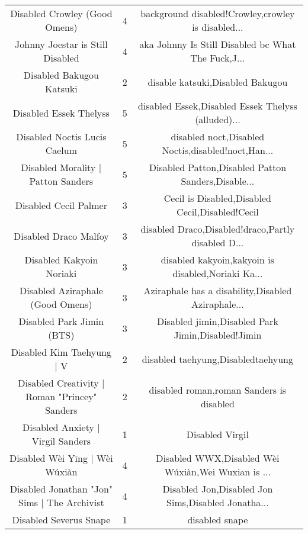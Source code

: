 \begin{table}[h!]
{\begin{tabular}{|c|c|c|}
                     Disabled Crowley (Good Omens) &      4 & background disabled!Crowley,crowley is disabled... \\
                  Johnny Joestar is Still Disabled &      4 & aka Johnny Is Still Disabled bc What The Fuck,J... \\
                          Disabled Bakugou Katsuki &      2 &                   disable katsuki,Disabled Bakugou \\
                            Disabled Essek Thelyss &      5 & disabled Essek,Disabled Essek Thelyss (alluded)... \\
                      Disabled Noctis Lucis Caelum &      5 & disabled noct,Disabled Noctis,disabled!noct,Han... \\
                Disabled Morality | Patton Sanders &      5 & Disabled Patton,Disabled Patton Sanders,Disable... \\
                             Disabled Cecil Palmer &      3 &    Cecil is Disabled,Disabled Cecil,Disabled!Cecil \\
                             Disabled Draco Malfoy &      3 & disabled Draco,Disabled!draco,Partly disabled D... \\
                          Disabled Kakyoin Noriaki &      3 & disabled kakyoin,kakyoin is disabled,Noriaki Ka... \\
                  Disabled Aziraphale (Good Omens) &      3 & Aziraphale has a disability,Disabled Aziraphale... \\
                         Disabled Park Jimin (BTS) &      3 &  Disabled jimin,Disabled Park Jimin,Disabled!Jimin \\
                         Disabled Kim Taehyung | V &      2 &                 disabled taehyung,Disabledtaehyung \\
     Disabled Creativity | Roman "Princey" Sanders &      2 &           disabled roman,roman Sanders is disabled \\
                 Disabled Anxiety | Virgil Sanders &      1 &                                    Disabled Virgil \\
                    Disabled Wèi Yīng | Wèi Wúxiàn &      4 & Disabled WWX,Disabled Wèi Wúxiàn,Wei Wuxian is ... \\
      Disabled Jonathan "Jon" Sims | The Archivist &      4 & Disabled Jon,Disabled Jon Sims,Disabled Jonatha... \\
                            Disabled Severus Snape &      1 &                                     disabled snape \\

\end{tabular}}
\end{table}
